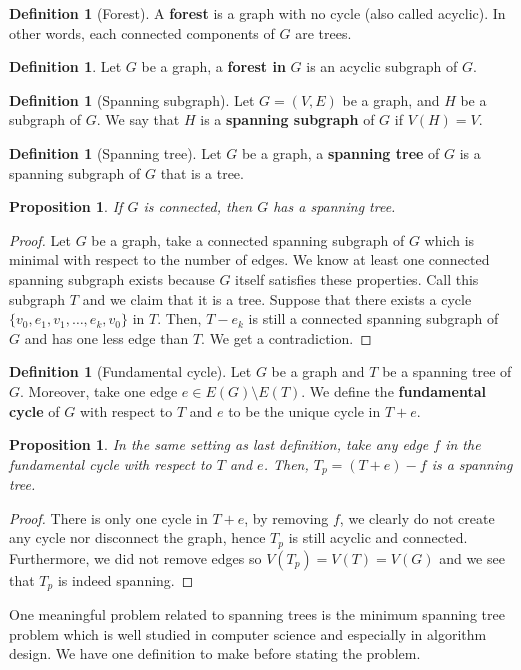 \documentclass{tufte-handout}
\newtheorem{prop}[thm]{Proposition}
\theoremstyle{definition}
\newtheorem{defn}[thm]{Definition}
\theoremstyle{remark}
\begin{document}
\begin{defn}[Forest]
	A \textbf{forest} is a graph with no cycle (also called acyclic). In other words, each connected components of $G$ are trees.
\end{defn}
\begin{defn}
	Let $G$ be a graph, a \textbf{forest in} $G$ is an acyclic subgraph of $G$.
\end{defn}
\begin{defn}[Spanning subgraph]
	Let $G= (V,E)$ be a graph, and $H$ be a subgraph of $G$. We say that $H$ is a \textbf{spanning subgraph} of $G$ if $V(H) = V$.
\end{defn}
\begin{defn}[Spanning tree]
	Let $G$ be a graph, a \textbf{spanning tree} of $G$ is a spanning subgraph of $G$ that is a tree.
\end{defn}
\begin{prop}
	If $G$ is connected, then $G$ has a spanning tree.
\end{prop}
\begin{proof}
	Let $G$ be a graph, take a connected spanning subgraph of $G$ which is minimal with respect to the number of edges. We know at least one connected spanning subgraph exists because $G$ itself satisfies these properties. Call this subgraph $T$ and we claim that it is a tree. Suppose that there exists a cycle $\{v_0, e_1, v_1, \dots, e_k, v_0\}$ in $T$. Then, $T-e_k$ is still a connected spanning subgraph of $G$ and has one less edge than $T$. We get a contradiction. 
\end{proof}
\begin{defn}[Fundamental cycle]
	Let $G$ be a graph and $T$ be a spanning tree of $G$. Moreover, take one edge $e \in E(G)\setminus E(T)$. We define the \textbf{fundamental cycle} of $G$ with respect to $T$ and $e$ to be the unique cycle in $T+e$.
\end{defn}
\begin{prop}
	In the same setting as last definition, take any edge $f$ in the fundamental cycle with respect to $T$ and $e$. Then, $T_p = (T+e)-f$ is a spanning tree.
\end{prop}
\begin{proof}
	There is only one cycle in $T+e$, by removing $f$, we clearly do not create any cycle nor disconnect the graph, hence $T_p$ is still acyclic and connected. Furthermore, we did not remove edges so $V(T_p) = V(T) = V(G)$ and we see that $T_p$ is indeed spanning.
\end{proof}
One meaningful problem related to spanning trees is the minimum spanning tree problem which is well studied in computer science and especially in algorithm design. We have one definition to make before stating the problem.
\end{document}
